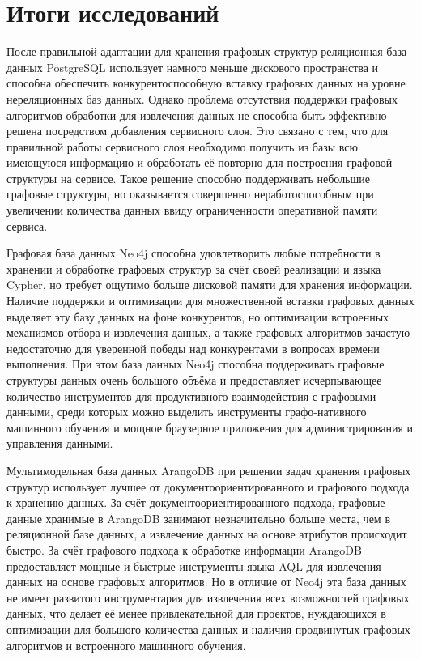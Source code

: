 \section{Итоги исследований}

После правильной адаптации для хранения графовых структур реляционная база данных PostgreSQL использует намного меньше дискового пространства и способна обеспечить конкурентоспособную вставку графовых данных на уровне нереляционных баз данных. Однако проблема отсутствия поддержки графовых алгоритмов обработки для извлечения данных не способна быть эффективно решена посредством добавления сервисного слоя. Это связано с тем, что для правильной работы сервисного слоя необходимо получить из базы всю имеющуюся информацию и обработать её повторно для построения графовой структуры на сервисе. Такое решение способно поддерживать небольшие графовые структуры, но оказывается совершенно неработоспособным при увеличении количества данных ввиду ограниченности оперативной памяти сервиса.

Графовая база данных Neo4j способна удовлетворить любые потребности в хранении и обработке графовых структур за счёт своей реализации и языка Cypher, но требует ощутимо больше дисковой памяти для хранения информации. Наличие поддержки и оптимизации для множественной вставки графовых данных выделяет эту базу данных на фоне конкурентов, но оптимизации встроенных механизмов отбора и извлечения данных, а также графовых алгоритмов зачастую недостаточно для уверенной победы над конкурентами в вопросах времени выполнения. При этом база данных Neo4j способна поддерживать графовые структуры данных очень большого объёма и предоставляет исчерпывающее количество инструментов для продуктивного взаимодействия с графовыми данными, среди которых можно выделить инструменты графо-нативного машинного обучения и мощное браузерное приложения для администрирования и управления данными.

Мультимодельная база данных ArangoDB при решении задач хранения графовых структур использует лучшее от документоориентированного и графового подхода к хранению данных. За счёт документоориентированного подхода, графовые данные хранимые в ArangoDB занимают незначительно больше места, чем в реляционной базе данных, а извлечение данных на основе атрибутов происходит быстро. За счёт графового подхода к обработке информации ArangoDB предоставляет мощные и быстрые инструменты языка AQL для извлечения данных на основе графовых алгоритмов. Но в отличие от Neo4j эта база данных не имеет развитого инструментария для извлечения всех возможностей графовых данных, что делает её менее привлекательной для проектов, нуждающихся в оптимизации для большого количества данных и наличия продвинутых графовых алгоритмов и встроенного машинного обучения.

%
